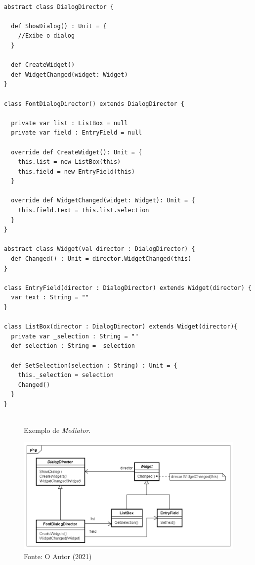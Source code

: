 \begin{lstlisting}[caption={\textit{Mediator} Orientado a Objetos.},label=oomediator]

abstract class DialogDirector {

  def ShowDialog() : Unit = {
    //Exibe o dialog
  }

  def CreateWidget()
  def WidgetChanged(widget: Widget)
}

class FontDialogDirector() extends DialogDirector {

  private var list : ListBox = null
  private var field : EntryField = null

  override def CreateWidget(): Unit = {
    this.list = new ListBox(this)
    this.field = new EntryField(this)
  }

  override def WidgetChanged(widget: Widget): Unit = {
    this.field.text = this.list.selection
  }
}

abstract class Widget(val director : DialogDirector) {
  def Changed() : Unit = director.WidgetChanged(this)
}

class EntryField(director : DialogDirector) extends Widget(director) {
  var text : String = ""
}

class ListBox(director : DialogDirector) extends Widget(director){
  private var _selection : String = ""
  def selection : String = _selection

  def SetSelection(selection : String) : Unit = {
    this._selection = selection
    Changed()
  }
}
    
\end{lstlisting}

\begin{figure}[htb]
	\caption{\label{mediator_exemplo}Exemplo de \textit{Mediator}.}
	\begin{center}
	    \includegraphics[scale=0.5]{5_padroes-contexto-funcional/5.3_comportamentais/5.3.05_mediator/mediator_exemplo.png}
	\end{center}
  \caption*{Fonte: O Autor (2021)}
\end{figure}

